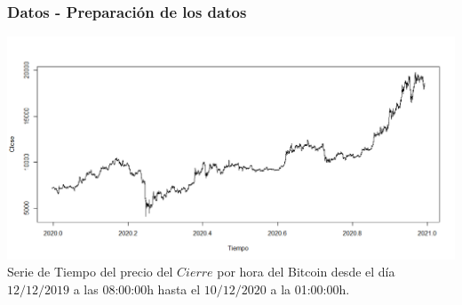 \documentclass{beamer}
\begin{document}

\begin{frame}[t]
\frametitle{ Datos - Preparación de los datos}

\vfill
\centering
\includegraphics[width=1\textwidth]{serie}
Serie de Tiempo del precio del $Cierre$ por hora del Bitcoin desde el día $12/12/2019$ a las 08:00:00h hasta el $10/12/2020$ a la 01:00:00h.

\end{frame}
\end{document}
